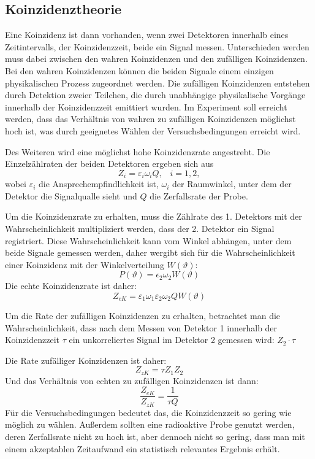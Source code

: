 \documentclass[11pt]{scrartcl}
\begin{document}
\subsection{Koinzidenztheorie}
Eine Koinzidenz ist dann vorhanden, wenn zwei Detektoren
innerhalb eines Zeitintervalls, der Koinzidenzzeit, beide ein 
Signal messen. Unterschieden werden muss dabei zwischen den 
wahren Koinzidenzen und den zufälligen Koinzidenzen. Bei den wahren
Koinzidenzen können die beiden Signale einem einzigen physikalischen
Prozess zugeordnet werden. Die zufälligen Koinzidenzen entstehen
durch Detektion zweier Teilchen, die durch unabhängige physikalische
Vorgänge innerhalb der Koinzidenzzeit emittiert wurden. Im Experiment
soll erreicht werden, dass das Verhältnis von wahren zu zufälligen 
Koinzidenzen möglichst hoch ist, was durch geeignetes Wählen der 
Versuchsbedingungen erreicht wird.

Des Weiteren wird eine möglichst hohe Koinzidenzrate angestrebt. 
Die Einzelzählraten der beiden Detektoren ergeben sich aus
\begin{equation}
 Z_i=\varepsilon_i \omega_i Q, \;\;\; i=1,2,
\end{equation}
wobei $\varepsilon_i$ die Ansprechempfindlichkeit ist, $\omega_i$
der Raumwinkel, unter dem der Detektor die Signalqualle sieht und
$Q$ die Zerfallsrate der Probe. 

Um die Koinzidenzrate zu erhalten, muss die Zählrate des 1. Detektors
mit der Wahrscheinlichkeit multipliziert werden, dass der 2. 
Detektor ein Signal registriert. Diese Wahrscheinlichkeit kann 
vom Winkel abhängen, unter dem beide Signale gemessen werden, daher
wergibt sich für die Wahrscheinlichkeit einer Koinzidenz mit der 
Winkelverteilung $W(\vartheta)$:
\begin{equation}
 P(\vartheta)=\epsilon_2\omega_2 W(\vartheta)
\end{equation}
Die echte Koinzidenzrate ist daher:
\begin{equation}
 Z_{eK}=\varepsilon_1 \omega_1 \varepsilon_2 \omega_2 Q W(\vartheta)
\end{equation}

Um die Rate der zufälligen Koinzidenzen zu erhalten, betrachtet man die Wahrscheinlichkeit, dass
nach dem Messen von Detektor 1 innerhalb der Koinzidenzzeit $\tau$ ein unkorreliertes Signal im Detektor 2 
gemessen wird: $Z_2\cdot \tau$

Die Rate zufälliger Koinzidenzen ist daher:
\begin{equation}
 Z_{zK}=\tau Z_1Z_2
\end{equation}
Und das Verhältnis von echten zu zufälligen Koinzidenzen ist dann:
\begin{equation}
 \frac{Z_{eK}}{Z_{zK}}=\frac{1}{\tau Q}
\end{equation}
Für die Versuchsbedingungen bedeutet das, die Koinzidenzzeit so gering wie möglich zu wählen.
Außerdem sollten eine radioaktive Probe genutzt werden, deren Zerfallsrate nicht zu hoch ist,
aber dennoch nicht so gering,
dass man mit einem akzeptablen Zeitaufwand ein statistisch relevantes Ergebnis erhält.
\end{document}
